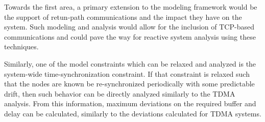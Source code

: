 Towards the first area, a primary extension to the modeling framework
would be the support of retun-path communications and the impact they
have on the system.  Such modeling and analysis would allow for the
inclusion of TCP-based communications and could pave the way for
reactive system analysis using these techniques.  

Similarly, one of the model constraints which can be relaxed and
analyzed is the system-wide time-synchronization constraint.  If that
constraint is relaxed such that the nodes are known be re-synchronized
periodically with some predictable drift, then such behavior can be
directly analyzed similarly to the TDMA analysis.  From this
information, maximum deviations on the required buffer and delay can
be calculated, similarly to the deviations calculated for TDMA
systems.


